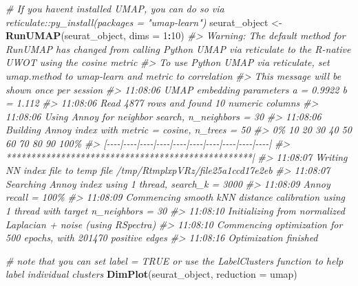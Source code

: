 \documentclass[
]{book}
\newenvironment{Shaded}{\begin{snugshade}}{\end{snugshade}}
\newcommand{\AttributeTok}[1]{\textcolor[rgb]{0.13,0.29,0.53}{#1}}
\newcommand{\CommentTok}[1]{\textcolor[rgb]{0.56,0.35,0.01}{\textit{#1}}}
\newcommand{\DecValTok}[1]{\textcolor[rgb]{0.00,0.00,0.81}{#1}}
\newcommand{\FunctionTok}[1]{\textcolor[rgb]{0.13,0.29,0.53}{\textbf{#1}}}
\newcommand{\NormalTok}[1]{#1}
\newcommand{\OtherTok}[1]{\textcolor[rgb]{0.56,0.35,0.01}{#1}}
\newcommand{\SpecialCharTok}[1]{\textcolor[rgb]{0.81,0.36,0.00}{\textbf{#1}}}
\newcommand{\StringTok}[1]{\textcolor[rgb]{0.31,0.60,0.02}{#1}}
\begin{document}
\begin{Shaded}
\begin{Highlighting}[]
\CommentTok{\# If you haven\textquotesingle{}t installed UMAP, you can do so via reticulate::py\_install(packages = "umap{-}learn")}
\NormalTok{seurat\_object }\OtherTok{\textless{}{-}} \FunctionTok{RunUMAP}\NormalTok{(seurat\_object, }\AttributeTok{dims =} \DecValTok{1}\SpecialCharTok{:}\DecValTok{10}\NormalTok{)}
\CommentTok{\#\textgreater{} Warning: The default method for RunUMAP has changed from calling Python UMAP via reticulate to the R{-}native UWOT using the cosine metric}
\CommentTok{\#\textgreater{} To use Python UMAP via reticulate, set umap.method to \textquotesingle{}umap{-}learn\textquotesingle{} and metric to \textquotesingle{}correlation\textquotesingle{}}
\CommentTok{\#\textgreater{} This message will be shown once per session}
\CommentTok{\#\textgreater{} 11:08:06 UMAP embedding parameters a = 0.9922 b = 1.112}
\CommentTok{\#\textgreater{} 11:08:06 Read 4877 rows and found 10 numeric columns}
\CommentTok{\#\textgreater{} 11:08:06 Using Annoy for neighbor search, n\_neighbors = 30}
\CommentTok{\#\textgreater{} 11:08:06 Building Annoy index with metric = cosine, n\_trees = 50}
\CommentTok{\#\textgreater{} 0\%   10   20   30   40   50   60   70   80   90   100\%}
\CommentTok{\#\textgreater{} [{-}{-}{-}{-}|{-}{-}{-}{-}|{-}{-}{-}{-}|{-}{-}{-}{-}|{-}{-}{-}{-}|{-}{-}{-}{-}|{-}{-}{-}{-}|{-}{-}{-}{-}|{-}{-}{-}{-}|{-}{-}{-}{-}|}
\CommentTok{\#\textgreater{} **************************************************|}
\CommentTok{\#\textgreater{} 11:08:07 Writing NN index file to temp file /tmp/RtmplxpVRz/file25a1ccd17e2eb}
\CommentTok{\#\textgreater{} 11:08:07 Searching Annoy index using 1 thread, search\_k = 3000}
\CommentTok{\#\textgreater{} 11:08:09 Annoy recall = 100\%}
\CommentTok{\#\textgreater{} 11:08:09 Commencing smooth kNN distance calibration using 1 thread with target n\_neighbors = 30}
\CommentTok{\#\textgreater{} 11:08:10 Initializing from normalized Laplacian + noise (using RSpectra)}
\CommentTok{\#\textgreater{} 11:08:10 Commencing optimization for 500 epochs, with 201470 positive edges}
\CommentTok{\#\textgreater{} 11:08:16 Optimization finished}
\end{Highlighting}
\end{Shaded}

\begin{Shaded}
\begin{Highlighting}[]
\CommentTok{\# note that you can set \textasciigrave{}label = TRUE\textasciigrave{} or use the LabelClusters function to help label individual clusters}
\FunctionTok{DimPlot}\NormalTok{(seurat\_object, }\AttributeTok{reduction =} \StringTok{\textquotesingle{}umap\textquotesingle{}}\NormalTok{)}
\end{Highlighting}
\end{Shaded}
\end{document}
